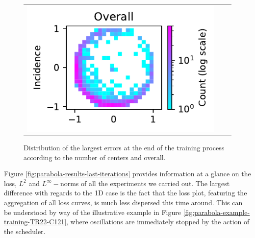 \documentclass[12pt]{report} %
\begin{document}
\begin{figure}[h]
\begin{tabular}{ccc}
    \includegraphics[width=.4\textwidth]{imagenes/experiments/2d/statistical_2d_full_scheduler_interpolation/parabola/distribution_of_errors_L_inf_end.pdf}
  \end{tabular}
  \caption{Distribution of the largest errors at the end of the training process according to the number of centers and overall.}
  \label{fig:parabola-results-largest-errors}
\end{figure}

Figure \ref{fig:parabola-results-last-iterations} provides information at a glance on the loss, $L^2$ and $L^\infty-$norms of all the experiments we carried out. The largest difference with regards to the 1D case is the fact that the loss plot, featuring the aggregation of all loss curves, is much less dispersed this time around. This can be understood by way of the illustrative example in Figure \ref{fig:parabola-example-training-TR22-C121}, where oscillations are immediately stopped by the action of the scheduler.
\end{document}
